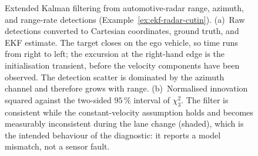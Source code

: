 \documentclass[11pt,oneside,openany]{book}
\begin{document}
\begin{figure}[!t]
{
}
\caption{\color{olive}Extended Kalman filtering from automotive-radar
range, azimuth, and range-rate detections (Example~\ref{ex:ekf-radar-cutin}).
(a)~Raw detections converted to Cartesian coordinates, ground truth, and EKF
estimate. The target closes on the ego vehicle, so time runs from right to left;
the excursion at the right-hand edge is the initialisation transient, before the
velocity components have been observed. The detection scatter is dominated by
the azimuth channel and therefore grows with range. (b)~Normalised innovation
squared against the two-sided $95\,\%$ interval of $\chi^{2}_{3}$. The filter is
consistent while the constant-velocity assumption holds and becomes measurably
inconsistent during the lane change (shaded), which is the intended behaviour of
the diagnostic: it reports a model mismatch, not a sensor fault.\color{black}}
\label{fig:ekf-radar-cutin}
\end{figure}
\end{document}
